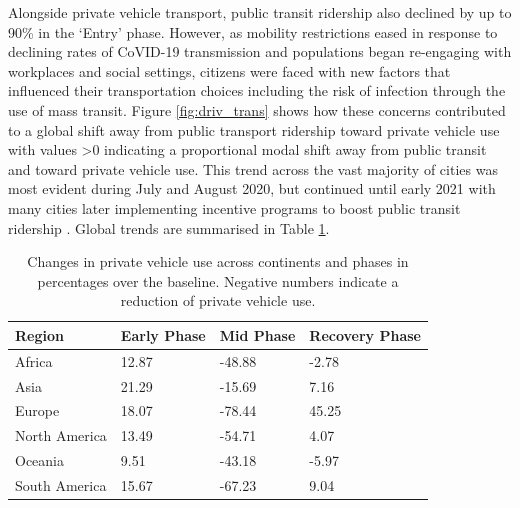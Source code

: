 \documentclass[preprint,10pt]{elsarticle} %
\begin{document}
Alongside private vehicle transport, public transit ridership also declined by up to 90\% in the `Entry' phase\cite{TransitCovid_Gkiotsalitis}. However, as mobility restrictions eased in response to declining rates of CoVID-19 transmission and populations began re-engaging with workplaces and social settings, citizens were faced with new factors that influenced their transportation choices including the risk of infection through the use of mass transit\cite{BECKTransit}. Figure \ref{fig:driv_trans} shows how these concerns contributed to a global shift away from public transport ridership toward private vehicle use with values \textgreater 0 indicating a proportional modal shift away from public transit and toward private vehicle use. This trend across the vast majority of cities was most evident during July and August 2020, but continued until early 2021 with many cities later implementing incentive programs to boost public transit ridership \cite{dai2021improving}. Global trends are summarised in Table \ref{tab:driving}.

\begin{table}
\caption{Changes in private vehicle use across continents and phases in percentages over the baseline. Negative numbers indicate a reduction of private vehicle use.}
\begin{tabular}{ |l|l|l|l| }
\hline
\textbf{Region} & \textbf{Early Phase} & \textbf{Mid Phase} & \textbf{Recovery Phase}  \\ 
\hline
Africa         & \cellcolor{red!12}12.87 & \cellcolor{blue!15}-48.88 & \cellcolor{blue!10}-2.78  \\ \hline
Asia           & \cellcolor{red!15}21.29 & \cellcolor{blue!10}-15.69 & \cellcolor{red!10} 7.16  \\ \hline
Europe         & \cellcolor{red!13}18.07 & \cellcolor{blue!20}-78.44 & \cellcolor{red!25} 45.25  \\ \hline
North America  & \cellcolor{red!12}13.49 & \cellcolor{blue!16}-54.71 & \cellcolor{red!10}4.07  \\ \hline
Oceania        &  \cellcolor{red!10}9.51 & \cellcolor{blue!15}-43.18 & \cellcolor{blue!10}-5.97  \\ \hline
South America  & \cellcolor{red!12}15.67 & \cellcolor{blue!18}-67.23 & \cellcolor{red!10}9.04  \\ \hline
\end{tabular}\label{tab:driving}
\end{table}
\end{document}
